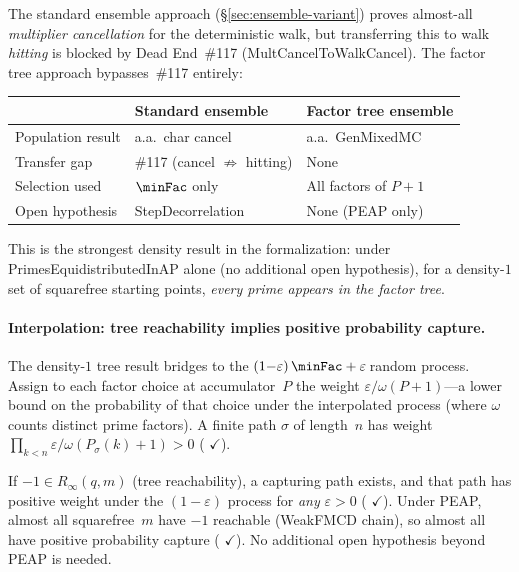 \begin{deadend}[title={Dead End \#117: MultCancelToWalkCancel}]
The standard ensemble approach
(\S\ref{sec:ensemble-variant}) proves almost-all
\emph{multiplier cancellation} for the deterministic walk, but
transferring this to walk \emph{hitting} is blocked by
Dead End~\#117 (MultCancelToWalkCancel).  The factor tree approach
bypasses~\#117 entirely:
\smallskip
\begin{center}
\begin{tabular}{@{}l@{\quad}l@{\quad}l@{}}
\toprule
 & \textbf{Standard ensemble} & \textbf{Factor tree ensemble} \\
\midrule
Population result & a.a.\ char cancel & a.a.\ GenMixedMC \\
Transfer gap & \#117 (cancel $\not\Rightarrow$ hitting) & None \\
Selection used & $\minFac$ only & All factors of $P{+}1$ \\
Open hypothesis & StepDecorrelation & None (PEAP only) \\
\bottomrule
\end{tabular}
\end{center}
\end{deadend}

\smallskip\noindent
This is the strongest density result in the formalization: under
PrimesEquidistributedInAP alone (no additional open hypothesis),
for a density-$1$ set of squarefree
starting points, \emph{every prime appears in the factor tree}.

\paragraph{Interpolation: tree reachability implies positive probability capture.}
The density-$1$ tree result bridges to the $(1{-}\varepsilon)\,\minFac
+ \varepsilon\,$random process.  Assign to each factor choice at
accumulator~$P$ the weight $\varepsilon / \omega(P{+}1)$---a lower
bound on the probability of that choice under the interpolated process
(where $\omega$ counts distinct prime factors).  A finite path
$\sigma$ of length~$n$ has weight
$\prod_{k<n} \varepsilon / \omega(P_\sigma(k){+}1) > 0$
(
{\color{leanink}$\checkmark$}).

If $-1 \in R_\infty(q,m)$ (tree reachability), a capturing path
exists, and that path has positive weight under the
$(1{-}\varepsilon)$ process for \emph{any} $\varepsilon > 0$
(
{\color{leanink}$\checkmark$}).
Under PEAP, almost all squarefree~$m$ have $-1$ reachable
(WeakFMCD chain), so almost all have positive probability
capture
(
{\color{leanink}$\checkmark$}).
No additional open hypothesis beyond PEAP is needed.


